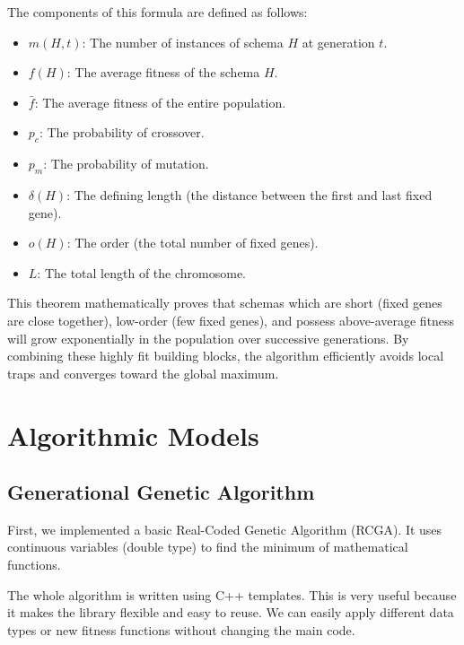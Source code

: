 \documentclass[conference]{IEEEtran}
\begin{document}
        The components of this formula are defined as follows:
        \begin{itemize}
            \item $m(H, t)$: The number of instances of schema $H$ at generation $t$.
            \item $f(H)$: The average fitness of the schema $H$.
            \item $\bar{f}$: The average fitness of the entire population.
            \item $p_c$: The probability of crossover.
            \item $p_m$: The probability of mutation.
            \item $\delta(H)$: The defining length (the distance between the first and last fixed gene).
            \item $o(H)$: The order (the total number of fixed genes).
            \item $L$: The total length of the chromosome.
        \end{itemize}

    This theorem mathematically proves that schemas which are short (fixed genes are close together), low-order (few fixed genes), and possess above-average fitness will grow exponentially in the population over successive generations. By combining these highly fit building blocks, the algorithm efficiently avoids local traps and converges toward the global maximum.

    \section{Algorithmic Models}
    
    \subsection{Generational Genetic Algorithm}
    First, we implemented a basic Real-Coded Genetic Algorithm (RCGA). It uses continuous variables (double type) to find the minimum of mathematical functions. 

    The whole algorithm is written using C++ templates. This is very useful because it makes the library flexible and easy to reuse. We can easily apply different data types or new fitness functions without changing the main code.
\end{document}
